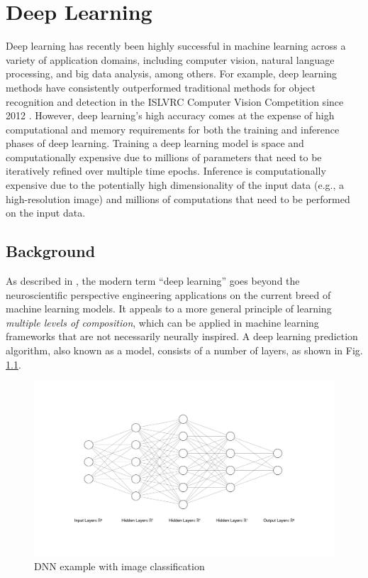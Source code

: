 \chapter{Deep Learning}
Deep learning has recently been highly successful in machine learning across a variety of application domains, including computer vision, natural language processing, and big data analysis, among others. For example, deep learning methods have consistently outperformed traditional methods for object recognition and detection in the ISLVRC Computer Vision Competition since 2012 \cite{ILSVRC15}. However, deep learning’s high accuracy comes at the expense of high computational and memory requirements for both the training and inference phases of deep learning. Training a deep learning model is space and computationally expensive due to millions of parameters that need to be iteratively refined over multiple time epochs. Inference is computationally expensive due to the potentially high dimensionality of the input data (e.g., a high-resolution image) and millions of computations that need to be performed on the input data.

\section{Background}
As described in \cite{Goodfellow-et-al-2016}, the modern term “deep learning” goes beyond the neuroscientific perspective engineering applications on the current breed of machine learning models. It appeals to a more general principle of learning \textit{multiple levels of composition}, which can be applied in machine learning frameworks that are not necessarily neurally inspired.
A deep learning prediction algorithm, also known as a model, consists of a number of layers, as shown in Fig. \ref{fig:dnn}.

\begin{figure}
	\includegraphics[width=\textwidth]{images/nn.png}
	\caption[DNN example]{DNN example with image classification}
	\label{fig:dnn}
\end{figure}


